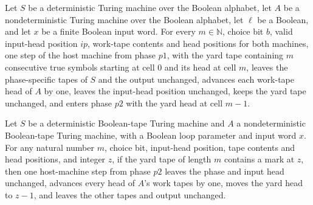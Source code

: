 \begin{theorem}
\label{Turing.ClockHost.p1_turn}
\leanok
{}
Let $S$ be a deterministic Turing machine over the Boolean alphabet, let $A$ be a
nondeterministic Turing machine over the Boolean alphabet, let $\ell$ be a Boolean, and
let $x$ be a finite Boolean input word. For every $m\in\mathbb{N}$, choice bit $b$,
valid input-head position $ip$, work-tape contents and head positions for both machines,
one step of the host machine from phase $p1$, with the yard tape containing $m$
consecutive true symbols starting at cell $0$ and its head at cell $m$, leaves the
phase-specific tapes of $S$ and the output unchanged, advances each work-tape head of
$A$ by one, leaves the input-head position unchanged, keeps the yard tape unchanged, and
enters phase $p2$ with the yard head at cell $m-1$.
\end{theorem}

\begin{theorem}
\label{Turing.ClockHost.p2_mark}
\leanok
{}
Let $S$ be a deterministic Boolean-tape Turing machine and $A$ a nondeterministic
Boolean-tape Turing machine, with a Boolean loop parameter and input word $x$. For any
natural number $m$, choice bit, input-head position, tape contents and head positions,
and integer $z$, if the yard tape of length $m$ contains a mark at $z$, then one
host-machine step from phase $p2$ leaves the phase and input head unchanged, advances
every head of $A$’s work tapes by one, moves the yard head to $z-1$, and leaves the
other tapes and output unchanged.
\end{theorem}


